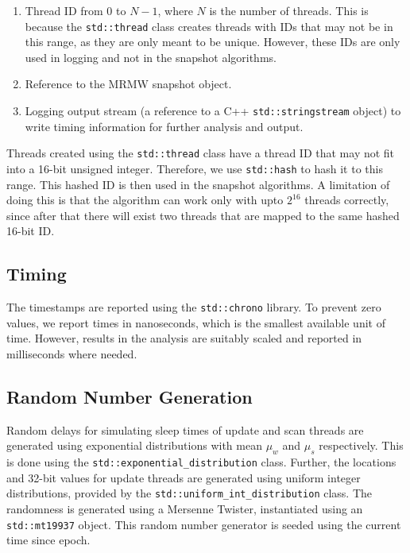 \documentclass[conference,compsoc]{IEEEtran}
\begin{document}
\begin{enumerate}
    \item Thread ID from 0 to \(N - 1\), where \(N\) is the number of threads.
    This is because the \texttt{std::thread} class creates threads with IDs that
    may not be in this range, as they are only meant to be unique. However,
    these IDs are only used in logging and not in the snapshot algorithms.
    \item Reference to the MRMW snapshot object.
    \item Logging output stream (a reference to a C++ \texttt{std::stringstream}
    object) to write timing information for further analysis and output.
\end{enumerate}

Threads created using the \texttt{std::thread} class have a thread ID that may
not fit into a 16-bit unsigned integer. Therefore, we use \texttt{std::hash} to
hash it to this range. This hashed ID is then used in the snapshot algorithms. A
limitation of doing this is that the algorithm can work only with upto
\(2^{16}\) threads correctly, since after that there will exist two threads that
are mapped to the same hashed 16-bit ID.

\subsection{Timing}
\label{subsec:timing}

The timestamps are reported using the \texttt{std::chrono} library. To prevent
zero values, we report times in nanoseconds, which is the smallest available
unit of time. However, results in the analysis are suitably scaled and reported
in milliseconds where needed.

\subsection{Random Number Generation}
\label{subsec:rng}

Random delays for simulating sleep times of update and scan threads are
generated using exponential distributions with mean \(\mu_w\) and \(\mu_s\)
respectively. This is done using the \texttt{std::exponential\_distribution}
class. Further, the locations and 32-bit values for update threads are generated
using uniform integer distributions, provided by the
\texttt{std::uniform\_int\_distribution} class. The randomness is generated
using a Mersenne Twister, instantiated using an \texttt{std::mt19937} object.
This random number generator is seeded using the current time since epoch.
\end{document}
